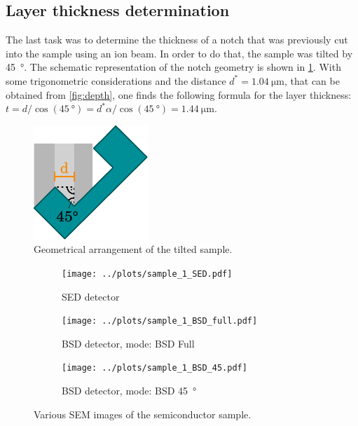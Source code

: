 \subsection{Layer thickness determination}
The last task was to determine the thickness of a notch that was
previously cut into the sample using an ion beam.
In order to do that, the sample was tilted by \qty{45}{\degree}.
The schematic representation of the notch geometry is shown
in \cref{fig:layer}.
With some trigonometric considerations and the distance
$d^*=\qty{1.04}{\micro\meter}$, that can be obtained from
\cref{fig:depth},
one finds the following formula for the layer thickness:
$t = d / \cos(\qty{45}{\degree}) = d^* \alpha / \cos(\qty{45}{\degree})
	= \qty{1.44}{\micro\meter}$.

\begin{figure}[!h]
	\centering
	\includegraphics{../assets/angle.pdf}
	\caption{Geometrical arrangement of the tilted sample.}
	\label{fig:layer}
\end{figure}

\begin{figure}[t!]
	\centering
	\begin{subfigure}{0.7\linewidth}
		\centering
		\texttt{[image: ../plots/sample\_1\_SED.pdf]}
		\caption{SED detector}
		\label{subfig:sample_0_sed}
	\end{subfigure}
	\begin{subfigure}{0.7\linewidth}
		\centering
		\texttt{[image: ../plots/sample\_1\_BSD\_full.pdf]}
		\caption{BSD detector,  mode: BSD Full}
		\label{subfig:sample_0_bsd_full}
	\end{subfigure}
	\begin{subfigure}{0.7\linewidth}
		\centering
		\texttt{[image: ../plots/sample\_1\_BSD\_45.pdf]}
		\caption{BSD detector, mode: BSD \qty{45}{\degree}}
		\label{subfig:sample_0_bsd_45}
	\end{subfigure}
	\caption{Various SEM images of the semiconductor sample.}
	\label{fig:sample_0}
\end{figure}

